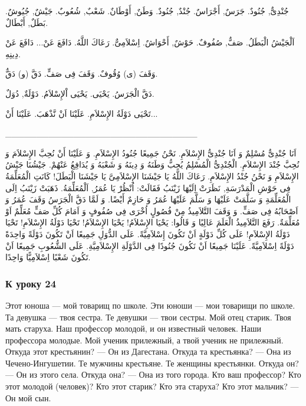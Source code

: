 \documentclass[a5paper]{article}
\begin{document}
جُنْدِىٌّ, جُنُودٌ. جَرَسٌ, أَجْرَاسٌ. جُنْدٌ, جُنُودٌ. وَطَنٌ, أَوْطَانٌ. شَعْبٌ, شُعُوبٌ. جَيْشٌ, جُيُوشٌ. بَطَلٌ, أَبْطَالٌ. 

اَلْجَيْشُ الْبَطَلُ. صَفٌّ, صُفُوفٌ. حَوْشٌ, أَحْوَاشٌ. اِسْلاَمِىٌّ. رَعَاكَ اللَّهُ. دَافَعَ عَنْ... دَافَعَ عَنْ دِينِهِ. 

وَقَفَ (ى) وُقُوفٌ. وَقَفَ فِى صَفٍّ. دَقَّ (و) دَقٌّ. 

دَقَّ الْجَرَسُ. يَحْيَى. يَحْيَى اْلإِسْلاَمُ. دَوْلَةٌ, دُوَلٌ. 

تَحْيَى دَوْلَةُ الإِسْلاَمِ. عَلَيْنَا اَنْ نَّذْهَبَ. عَلَيْنَا أَنْ...

\_\_\_\_\_\_\_\_\_\_\_\_\_\_\_\_\_\_\_\_\_\_\_\_\_\_\_\_\_\_\_

اَنَا جُنْدِىٌّ مُسْلِمٌ وَ اَنَا جُنْدِىُّ الإِسْلاَمِ. نَحْنُ جَمِيعًا جُنُودُ الإِسْلاَمِ. وَ عَلَيْنَا أَنْ نُحِبَّ الإِسْلاَمَ وَ نُحِبَّ جُنْدَ الإِسْلاَمِ. الْجُنْدِىُّ الْمُسْلِمُ يُحِبُّ وَطَنَهُ وَ دِينَهُ وَ شَعْبَهُ وَ يُدَافِعُ عَنْهُمْ. جَيْشُنَا جَيْشُ الإِسْلاَمِ وَ نَحْنُ جُنْدُ الإِسْلاَمِ. رَعَاكَ اللَّهُ يَا جَيْشَنَا الإِسْلاَمِىَّ يَا جَيْشَنَا الْبَطَلَ! كَانَتِ الْمُعَلِّمَةُ فِى حَوْشِ الْمَدْرَسَةِ, نَظَرَتْ اِلَيْهَا زَيْنَبُ فَقَالَتْ: اُنْظُرْ يَا عُمَرُ, اَلْمُعَلِّمَةُ. ذَهَبَتْ زَيْنَبُ اِلَى الْمُعَلِّمَةِ وَ سَلَّمَتْ عَلَيْهَا وَ سَلَّمَ عَلَيْهَا عُمَرُ وَ حَازِمٌ أَيْضًا. وَ لَمَّا دَقَّ الْجَرَسُ وَقَفَ عُمَرُ وَ اَصْحَابُهُ فِى صَفٍّ. وَ وَقَفَ التَّلاَمِيذُ مِنْ فُصُولٍ اُخْرَى فِى صُفُوفٍ وَ اَمَامَ كُلِّ صَفٍّ مُعَلِّمٌ اَوْ مُعَلِّمَةٌ. رَفَعَ التَّلاَمِيذُ الْعَلَمَ عَالِيًا وَ قَالُوا: يَحْيَا الإِسْلاَمُ! يَحْيَا الإِسْلاَمُ! تَحْيَا دَوْلَةُ الإِسْلاَمِ! تَحْيَا دَوْلَةُ الإِسْلاَمِ! عَلَى كُلِّ دَوْلَةٍ اَنْ تَكُونَ إِسْلاَمِيَّةً. عَلَى الدُّوَلِ جَمِيعًا اَنْ تَكُونَ دَوْلَةً وَاحِدَةً دَوْلَةً اِسْلاَمِيَّةً. عَلَيْنَا جَمِيعًا اَنْ نَكُونَ جُنُودًا فِى الدَّوْلَةِ الإِسْلاَمِيَّةِ. عَلَى الشُّعُوبِ جَمِيعًا اَنْ تَكُونَ شَعْبًا اِسْلاَمِيًّا وَاحِدًا.

\subsubsection[К уроку 24]{К уроку 24}
Этот юноша — мой товарищ по школе. Эти юноши — мои товарищи по школе. Та девушка — твоя сестра. Те девушки — твои сестры. Мой отец старик. Твоя мать старуха. Наш профессор молодой, и он известный человек. Наши профессора молодые. Мой ученик прилеж­ный, а твой ученик не прилежный. Откуда этот крестьянин? — Он из Дагестана. Откуда та крестьянка? — Она из Чечено-Ингушетии. Те мужчины крестьяне. Те женщины крестьянки. Откуда он? — Он из этого села. Откуда она? — Она из того города. Кто ваш профессор? Кто этот молодой (человек)? Кто этот старик? Кто эта старуха? Кто этот мальчик? — Он мой сын.
\end{document}
